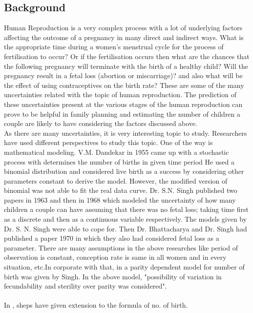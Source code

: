 \documentclass{article}
\begin{document}
\subsection{Background}
Human Reproduction is a very complex process with a lot of underlying factors aﬀecting the outcome of a pregnancy in many direct and indirect ways. What is the appropriate time during a women’s menstrual cycle for the process of fertilisation to occur? Or if the fertilisation occurs then what are the chances that the following pregnancy will terminate with the birth of a healthy child? Will the pregnancy result in a fetal loss (abortion or miscarriage)? and also what will be the eﬀect of using contraceptives on the birth rate? These are some of the many uncertainties related with the topic of human reproduction. The prediction of these uncertainties present at the various stages of the human reproduction can prove to be helpful in family planning and estimating the number of children a couple are likely to have considering the factors discussed above.
\newline 
\\As there are many uncertainties, it is very interesting topic to study. Researchers have used different perspectives to study this topic. One of the way is mathematical modeling. V.M. Dandekar in 1955 came up with a stochastic process with determines the number of births in given time period\cite{1} He used a binomial distribution and considered live birth as a success by considering other parameters constant to derive the model. However, the modified version of binomial was not able to fit the real data curve. Dr. S.N. Singh published two papers in 1963\cite{2} and then in 1968\cite{3} which modeled the uncertainty of how many children a couple can have assuming that there was no fetal loss; taking time first as a discrete and then as a continuous variable respectively. The models given by Dr. S. N. Singh were able to cope for. Then Dr. Bhattacharya and Dr. Singh had published a paper 1970 in which they also had considered fetal loss as a parameter\cite{4}. There are many assumptions in the above researches like period of observation is constant, conception rate is same in all women and in every situation, etc.In corporate with that, in \cite{5} a parity dependent model for number of birth was given by Singh. In the above
model, "possibility of variation in fecundability and sterility over parity was considered". 
\\\\In \cite{6}, sheps have given extension to the formula of no. of birth.
\end{document}
